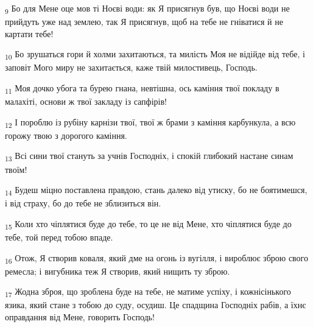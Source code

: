 \begin{tcolorbox}
\textsubscript{9} Бо для Мене оце мов ті Ноєві води: як Я присягнув був, що Ноєві води не прийдуть уже над землею, так Я присягнув, щоб на тебе не гніватися й не картати тебе!
\end{tcolorbox}
\begin{tcolorbox}
\textsubscript{10} Бо зрушаться гори й холми захитаються, та милість Моя не відійде від тебе, і заповіт Мого миру не захитається, каже твій милостивець, Господь.
\end{tcolorbox}
\begin{tcolorbox}
\textsubscript{11} Моя дочко убога та бурею гнана, невтішна, ось каміння твої покладу в малахіті, основи ж твої закладу із сапфірів!
\end{tcolorbox}
\begin{tcolorbox}
\textsubscript{12} І пороблю із рубіну карнізи твої, твої ж брами з каміння карбункула, а всю горожу твою з дорогого каміння.
\end{tcolorbox}
\begin{tcolorbox}
\textsubscript{13} Всі сини твої стануть за учнів Господніх, і спокій глибокий настане синам твоїм!
\end{tcolorbox}
\begin{tcolorbox}
\textsubscript{14} Будеш міцно поставлена правдою, стань далеко від утиску, бо не боятимешся, і від страху, бо до тебе не зблизиться він.
\end{tcolorbox}
\begin{tcolorbox}
\textsubscript{15} Коли хто чіплятися буде до тебе, то це не від Мене, хто чіплятися буде до тебе, той перед тобою впаде.
\end{tcolorbox}
\begin{tcolorbox}
\textsubscript{16} Отож, Я створив коваля, який дме на огонь із вугілля, і вироблює зброю свого ремесла; і вигубника теж Я створив, який нищить ту зброю.
\end{tcolorbox}
\begin{tcolorbox}
\textsubscript{17} Жодна зброя, що зроблена буде на тебе, не матиме успіху, і кожнісінького язика, який стане з тобою до суду, осудиш. Це спадщина Господніх рабів, а їхнє оправдання від Мене, говорить Господь!
\end{tcolorbox}
